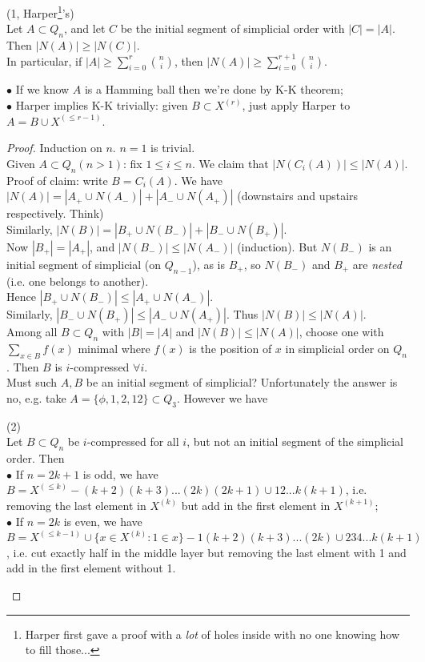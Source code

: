 \documentclass[a4paper]{article}
\begin{document}
\begin{thm} (1, Harper\footnote{Harper first gave a proof with a \emph{lot} of holes inside with no one knowing how to fill those...}'s)\\
    Let $A \subset Q_n$, and let $C$ be the initial segment of simplicial order with $|C| = |A|$. Then $|N(A)| \geq |N(C)|$.\\
    In particular, if $|A| \geq \sum_{i=0}^r {n \choose i}$, then $|N(A)| \geq \sum_{i=0}^{r+1} {n \choose i}$.

    \begin{rem}
        $\bullet$ If we know $A$ is a Hamming ball then we're done by K-K theorem;\\
        $\bullet$ Harper implies K-K trivially: given $B \subset X^{(r)}$, just apply Harper to $A=B \cup X^{(\leq r-1)}$.
    \end{rem}
    
    \begin{proof}
        Induction on $n$. $n=1$ is trivial.\\
        Given $A \subset Q_n(n>1)$: fix $1 \leq i \leq n$. We claim that $|N(C_i(A))| \leq |N(A)|$.\\
        Proof of claim: write $B = C_i(A)$. We have $|N(A)| = |A_+ \cup N(A_-)| + |A_- \cup N(A_+)|$ (downstairs and upstairs respectively. Think)\\
        Similarly, $|N(B)| = |B_+ \cup N(B_-)| + |B_- \cup N(B_+)|$.\\
        Now $|B_+| = |A_+|$, and $|N(B_-)| \leq |N(A_-)|$ (induction). But $N(B_-)$ is an initial segment of simplicial (on $Q_{n-1}$), as is $B_+$, so $N(B_-)$ and $B_+$ are \emph{nested} (i.e. one belongs to another).\\
        Hence $|B_+ \cup N(B_-)| \leq |A_+ \cup N(A_-)|$.\\
        Similarly, $|B_- \cup N(B_+)| \leq |A_- \cup N(A_+)|$. Thus $|N(B)| \leq |N(A)|$.\\
        Among all $B \subset Q_n$ with $|B| = |A|$ and $|N(B)| \leq |N(A)|$, choose one with $\sum_{x \in B} f(x)$ minimal where $f(x)$ is the position of $x$ in simplicial order on $Q_n$. Then $B$ is $i$-compressed $\forall i$.\\
        Must such $A,B$ be an initial segment of simplicial? Unfortunately the answer is no, e.g. take $A=\{\phi,1,2,12\} \subset Q_3$.
        However we have 
        \begin{lemma} (2)\\
            Let $B \subset Q_n$ be $i$-compressed for all $i$, but not an initial segment of the simplicial order. Then\\
            $\bullet$ If $n=2k+1$ is odd, we have $B=X^{(\leq k)} - (k+2)(k+3)...(2k)(2k+1) \cup 12...k(k+1)$, i.e. removing the last element in $X^{(k)}$ but add in the first element in $X^{(k+1)}$;\\
            $\bullet$ If $n=2k$ is even, we have $B=X^{(\leq k-1)} \cup \{x \in X^{(k)}: 1 \in x\} - 1(k+2)(k+3)...(2k) \cup 234...k(k+1)$, i.e. cut exactly half in the middle layer but removing the last elment with 1 and add in the first element without 1.


\end{lemma}
\end{proof}
\end{thm}
\end{document}
